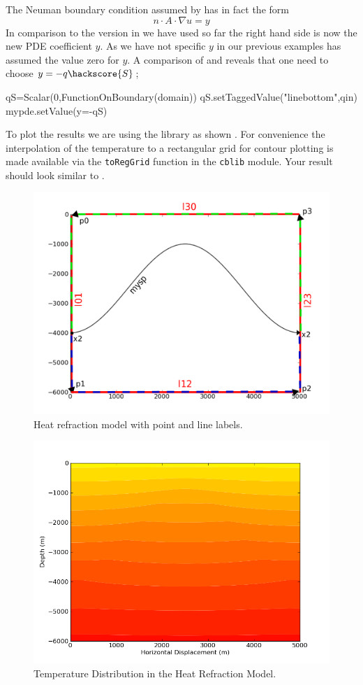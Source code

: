 The Neuman boundary condition assumed by \esc has in fact the form
\begin{equation}\label{NEUMAN 2b}
n\cdot A \cdot\nabla u = y 
\end{equation}
In comparison to the version in  we have used so far the right hand side is now 
the new PDE coefficient $y$. As we have not specific $y$ in our previous examples \esc has assumed
the value zero for $y$. A comparison of  and  reveals that one need to
choose $y=-q\hackscore{S}$;
\begin{python}
qS=Scalar(0,FunctionOnBoundary(domain))
qS.setTaggedValue("linebottom",qin)
mypde.setValue(y=-qS)
\end{python}
To plot the results we are using the \modmpl library as shown . For convenience
the interpolation of the temperature to a rectangular grid for contour plotting is made available
via the \verb|toRegGrid| function in the \verb|cblib| module. Your result should look similar to 
.

\begin{figure}[ht]
\centerline{\includegraphics[width=4.in]{figures/anticlineheatrefraction}}
\caption{Heat refraction model with point and line labels.}
\label{fig:anticlinehrmodel}
\end{figure}

\begin{figure}[ht]
\centerline{\includegraphics[width=4.in]{figures/heatrefraction}}
\caption{Temperature Distribution in the Heat Refraction Model.}
\label{fig:anticlinetemp}
\end{figure}

